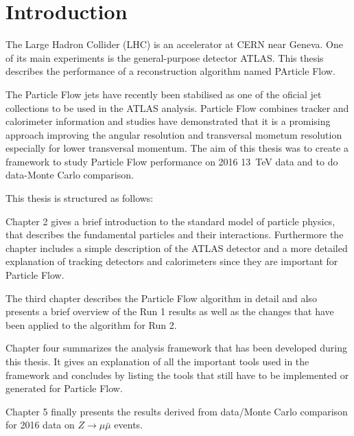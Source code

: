 \chapter{Introduction}
\label{sec:intro}

The Large Hadron Collider (LHC) is an accelerator at CERN near Geneva. One of its main experiments is the general-purpose detector ATLAS. This thesis describes the performance of a reconstruction algorithm named PArticle Flow.


The Particle Flow jets have recently been stabilised as one of the oficial jet collections to be used in the ATLAS analysis. Particle Flow combines tracker and calorimeter information and studies have demonstrated that it is a promising approach improving the angular resolution and transversal mometum resolution especially for lower transversal momentum. The aim of this thesis was to create a framework to study Particle Flow performance on 2016 \SI{13}{\TeV} data and to do data-Monte Carlo comparison.

This thesis is structured as follows:

Chapter 2 gives a brief introduction to the standard model of particle physics, that describes the fundamental particles and their interactions. Furthermore the chapter includes a simple description of the ATLAS detector and a more detailed explanation of tracking detectors and calorimeters since they are important for Particle Flow.

The third chapter describes the Particle Flow algorithm in detail and also presents a brief overview of the Run 1 results as well as the changes that have been applied to the algorithm for Run 2.

Chapter four summarizes the analysis framework that has been developed during this thesis. It gives an explanation of all the important tools used in the framework and concludes by listing the tools that still have to be implemented or generated for Particle Flow.

Chapter 5 finally presents the results derived from data/Monte Carlo comparison for 2016 data on $Z\rightarrow \mu \bar{\mu}$ events.




